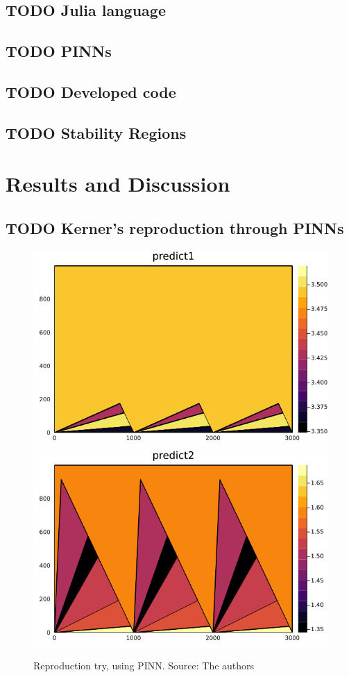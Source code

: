 \documentclass[12pt]{article}
\begin{document}
\subsection{{\bfseries\sffamily TODO} Julia language}
\label{sec:org412a699}
\subsection{{\bfseries\sffamily TODO} PINNs}
\label{sec:orgfd82340}
\subsection{{\bfseries\sffamily TODO} Developed code}
\label{sec:org86f9dd4}
\subsection{{\bfseries\sffamily TODO} Stability Regions}
\label{sec:orgb071807}
\section{Results and Discussion}
\label{sec:orga9122c5}
\subsection{{\bfseries\sffamily TODO} Kerner's reproduction through PINNs}
\label{sec:org14ffb3d}

\begin{figure}[!htb]
  \centering
  \caption{\label{fig:sim1} Reproduction try, using PINN. Source: The authors}
  \includegraphics[width=0.45\linewidth]{../img/sol_variable_corrected_bcs31.png}
  \includegraphics[width=0.45\linewidth]{../img/sol_variable_corrected_bcs32.png}
  \\ %
\end{figure}
\clearpage
\end{document}
